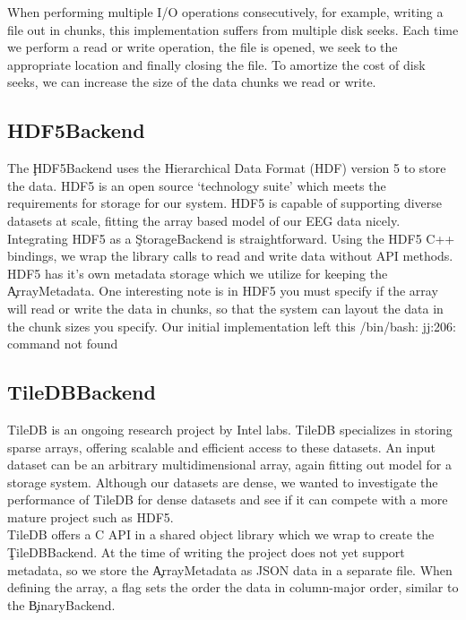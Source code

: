 When performing multiple I/O operations consecutively, for example, writing a
file out in chunks, this implementation suffers from multiple disk seeks. Each
time we perform a read or write operation, the file is opened, we seek to the
appropriate location and finally closing the file. To amortize the cost of disk
seeks, we can increase the size of the data chunks we read or write.

\subsection{HDF5Backend}\label{storage-ch:implementation-hdf5}

The \c{HDF5Backend} uses the Hierarchical Data Format (HDF) version 5
\cite{hdf5} to store the data. HDF5 is an open source `technology suite' which
meets the requirements for storage for our system. HDF5 is capable of
supporting diverse datasets at scale, fitting the array based model of our
EEG data nicely. \\

Integrating HDF5 as a \c{StorageBackend} is straightforward. Using the HDF5 C++
bindings, we wrap the library calls to read and write data without API methods.
HDF5 has it's own metadata storage which we utilize for keeping the
\c{ArrayMetadata}. One interesting note is in HDF5 you must specify if the
array will read or write the data in chunks, so that the system can layout the
data in the chunk sizes you specify. Our initial implementation left this
/bin/bash: jj:206: command not found

\subsection{TileDBBackend}\label{storage-ch:implementation-tiledb}

TileDB \cite{tiledb} is an ongoing research project by Intel labs. TileDB
specializes in storing sparse arrays, offering scalable and efficient access to
these datasets. An input dataset can be an arbitrary multidimensional array,
again fitting out model for a storage system. Although our datasets are dense,
we wanted to investigate the performance of TileDB for dense datasets and see
if it can compete with a more mature project such as HDF5.\\

TileDB offers a C API in a shared object library which we wrap to create the
\c{TileDBBackend}. At the time of writing the project does not yet support
metadata, so we store the \c{ArrayMetadata} as JSON data in a separate file.
When defining the array, a flag sets the order the data in column-major order,
similar to the \c{BinaryBackend}. \\

